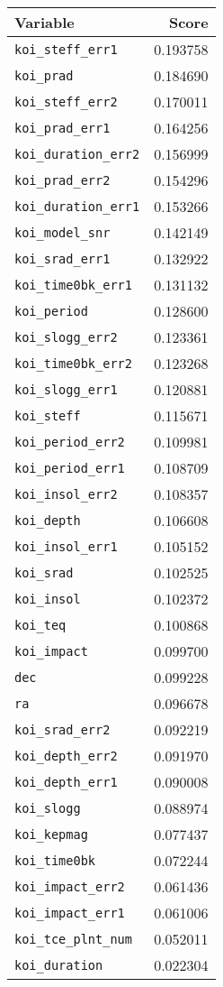 \begin{tabular}{lr}
\toprule
                     Variable &     Score \\
\midrule
    \texttt{koi\_steff\_err1} &  0.193758 \\
           \texttt{koi\_prad} &  0.184690 \\
    \texttt{koi\_steff\_err2} &  0.170011 \\
     \texttt{koi\_prad\_err1} &  0.164256 \\
 \texttt{koi\_duration\_err2} &  0.156999 \\
     \texttt{koi\_prad\_err2} &  0.154296 \\
 \texttt{koi\_duration\_err1} &  0.153266 \\
     \texttt{koi\_model\_snr} &  0.142149 \\
     \texttt{koi\_srad\_err1} &  0.132922 \\
  \texttt{koi\_time0bk\_err1} &  0.131132 \\
         \texttt{koi\_period} &  0.128600 \\
    \texttt{koi\_slogg\_err2} &  0.123361 \\
  \texttt{koi\_time0bk\_err2} &  0.123268 \\
    \texttt{koi\_slogg\_err1} &  0.120881 \\
          \texttt{koi\_steff} &  0.115671 \\
   \texttt{koi\_period\_err2} &  0.109981 \\
   \texttt{koi\_period\_err1} &  0.108709 \\
    \texttt{koi\_insol\_err2} &  0.108357 \\
          \texttt{koi\_depth} &  0.106608 \\
    \texttt{koi\_insol\_err1} &  0.105152 \\
           \texttt{koi\_srad} &  0.102525 \\
          \texttt{koi\_insol} &  0.102372 \\
            \texttt{koi\_teq} &  0.100868 \\
         \texttt{koi\_impact} &  0.099700 \\
                 \texttt{dec} &  0.099228 \\
                  \texttt{ra} &  0.096678 \\
     \texttt{koi\_srad\_err2} &  0.092219 \\
    \texttt{koi\_depth\_err2} &  0.091970 \\
    \texttt{koi\_depth\_err1} &  0.090008 \\
          \texttt{koi\_slogg} &  0.088974 \\
         \texttt{koi\_kepmag} &  0.077437 \\
        \texttt{koi\_time0bk} &  0.072244 \\
   \texttt{koi\_impact\_err2} &  0.061436 \\
   \texttt{koi\_impact\_err1} &  0.061006 \\
 \texttt{koi\_tce\_plnt\_num} &  0.052011 \\
       \texttt{koi\_duration} &  0.022304 \\
\bottomrule
\end{tabular}
